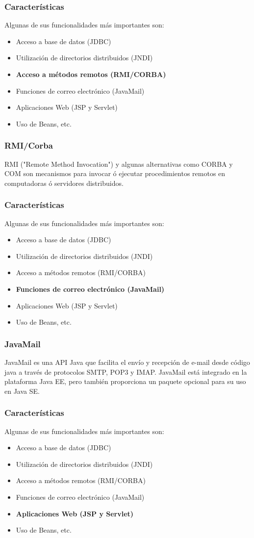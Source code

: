 \documentclass{beamer}
\begin{document}
\begin{frame}
  \frametitle{Características}
    Algunas de sus funcionalidades más importantes son:
  \begin{itemize}
    \item Acceso a base de datos (JDBC)
    \item Utilización de directorios distribuidos (JNDI)
    \item \textbf{Acceso a métodos remotos (RMI/CORBA)}
    \item Funciones de correo electrónico (JavaMail)
    \item Aplicaciones Web (JSP y Servlet)
    \item Uso de Beans, etc.
  \end{itemize}
\end{frame}

\begin{frame}
  \frametitle{RMI/Corba}
  RMI ("Remote Method Invocation") y algunas alternativas como CORBA y
  COM son mecanismos para invocar ó ejecutar procedimientos remotos en
  computadoras ó servidores distribuidos.
\end{frame}

\begin{frame}
  \frametitle{Características}
    Algunas de sus funcionalidades más importantes son:
  \begin{itemize}
    \item Acceso a base de datos (JDBC)
    \item Utilización de directorios distribuidos (JNDI)
    \item Acceso a métodos remotos (RMI/CORBA)
    \item \textbf{Funciones de correo electrónico (JavaMail)}
    \item Aplicaciones Web (JSP y Servlet)
    \item Uso de Beans, etc.
  \end{itemize}
\end{frame}

\begin{frame}
  \frametitle{JavaMail}
  JavaMail es una API Java que facilita el envío y recepción de e-mail
  desde código java a través de protocolos SMTP, POP3 y IMAP. JavaMail
  está integrado en la plataforma Java EE, pero también proporciona un
  paquete opcional para su uso en Java SE.
\end{frame}


\begin{frame}
  \frametitle{Características}
    Algunas de sus funcionalidades más importantes son:
  \begin{itemize}
    \item Acceso a base de datos (JDBC)
    \item Utilización de directorios distribuidos (JNDI)
    \item Acceso a métodos remotos (RMI/CORBA)
    \item Funciones de correo electrónico (JavaMail)
    \item \textbf{Aplicaciones Web (JSP y Servlet)}
    \item Uso de Beans, etc.
  \end{itemize}
\end{frame}
\end{document}
